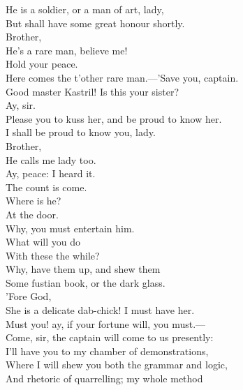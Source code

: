 \documentclass[a4paper,oneside]{memoir}
\begin{document}
\begin{drama*}
He is a soldier, or a man of art, lady,\\
But shall have some great honour shortly.\\
\pliantspeaks Brother,\\
He's a rare man, believe me!\\
\kastrilspeaks {} Hold your peace.\\
Here comes the t'other rare man.---'Save you, captain.\\
\facespeaks Good master Kastril! Is this your sister?\\
\kastrilspeaks Ay, sir.\\
Please you to kuss her, and be proud to know her.\\
\facespeaks I shall be proud to know you, lady.\\
\pliantspeaks {} Brother,\\
He calls me lady too.\\
\kastrilspeaks {} Ay, peace: I heard it.\\
\facespeaks The count is come.\\
\subtlespeaks {} Where is he?\\
\facespeaks {} At the door.\\
\subtlespeaks Why, you must entertain him.\\
\facespeaks {} What will you do\\
With these the while?\\
\subtlespeaks {} Why, have them up, and shew them\\
Some fustian book, or the dark glass.\\
\facespeaks {} 'Fore God,\\
She is a delicate dab-chick! I must have her.\\
\subtlespeaks Must you! ay, if your fortune will, you must.---\\
Come, sir, the captain will come to us presently:\\
I'll have you to my chamber of demonstrations,\\
Where I will shew you both the grammar and logic,\\
And rhetoric of quarrelling; my whole method\\

\end{drama*}
\end{document}
